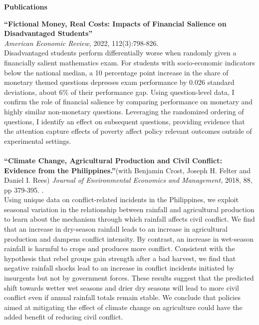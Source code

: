 \documentclass[10pt, oneside]{article}
\begin{document}
\begin{minipage}[t]{0.1\linewidth}
\textbf{Publications}
\end{minipage}\hspace{0.05\linewidth}
\begin{minipage}[t]{0.8\linewidth}

\textbf{``Fictional Money, Real Costs: Impacts of Financial Salience on Disadvantaged Students''}\\ \emph{ American Economic Review,} 2022, 112(3):798-826. \href{http://claireduq.github.io/FMRC_Duquennois.pdf}{\color{blue}{Available here}}\\
Disadvantaged students perform differentially worse when randomly given a financially salient mathematics exam. For students with socio-economic indicators below the national median, a 10 percentage point increase in the share of monetary themed questions depresses exam performance by 0.026 standard deviations, about 6\% of their performance gap. Using question-level data, I confirm the role of financial salience by comparing performance on monetary and highly similar non-monetary questions. Leveraging the randomized ordering of questions, I identify an effect on subsequent questions, providing evidence that the attention capture effects of poverty affect policy relevant outcomes outside of experimental settings. \\~\\


\textbf{``Climate Change, Agricultural Production and Civil Conflict: Evidence from the Philippines.''}(with Benjamin Crost, Joseph H. Felter and Daniel I. Rees) \emph{Journal of Environmental Economics and Management,} 2018, 88, pp 379-395. \href{http://claireduq.github.io/Climatephilippines.pdf}{\color{blue}{Available here}}. \\
Using unique data on conflict-related incidents in the Philippines, we exploit seasonal variation in the relationship between rainfall and agricultural production to learn about the mechanism through which rainfall affects civil conflict. We find that an increase in dry-season rainfall leads to an increase in agricultural production and dampens conflict intensity. By contrast, an increase in wet-season rainfall is harmful to crops and produces more conflict. Consistent with the hypothesis that rebel groups gain strength after a bad harvest, we find that negative rainfall shocks lead to an increase in conflict incidents initiated by insurgents but not by government forces. These results suggest that the predicted shift towards wetter wet seasons and drier dry seasons will lead to more civil conflict even if annual rainfall totals remain stable. We conclude that policies aimed at mitigating the effect of climate change on agriculture could have the added benefit of reducing civil conflict.\\~\\
\end{minipage}\vspace{4mm}
\end{document}
